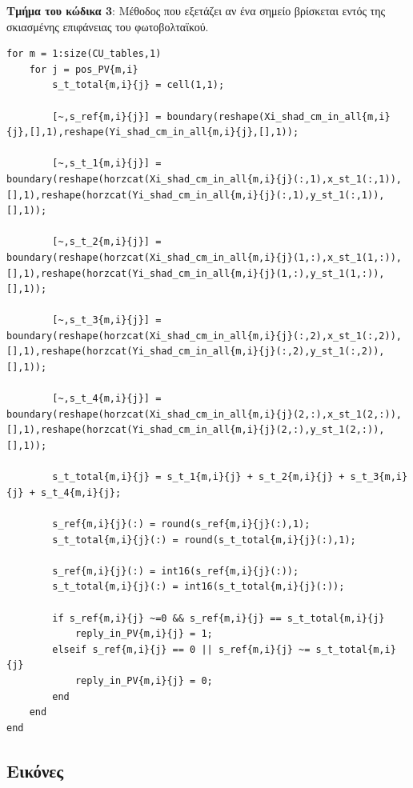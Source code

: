 \documentclass[12pt, a4paper]{report} %
\renewcommand{\thesubsection}{\arabic{section}.\arabic{subsection}.} %
\begin{document}
\noindent \textbf{Τμήμα του κώδικα 3}: Μέθοδος που εξετάζει αν ένα σημείο βρίσκεται εντός της σκιασμένης επιφάνειας του φωτοβολταϊκού.
\begin{lstlisting}
for m = 1:size(CU_tables,1)
    for j = pos_PV{m,i}
        s_t_total{m,i}{j} = cell(1,1);
        
        [~,s_ref{m,i}{j}] = boundary(reshape(Xi_shad_cm_in_all{m,i}{j},[],1),reshape(Yi_shad_cm_in_all{m,i}{j},[],1));

        [~,s_t_1{m,i}{j}] = boundary(reshape(horzcat(Xi_shad_cm_in_all{m,i}{j}(:,1),x_st_1(:,1)),[],1),reshape(horzcat(Yi_shad_cm_in_all{m,i}{j}(:,1),y_st_1(:,1)),[],1));
        
        [~,s_t_2{m,i}{j}] = boundary(reshape(horzcat(Xi_shad_cm_in_all{m,i}{j}(1,:),x_st_1(1,:)),[],1),reshape(horzcat(Yi_shad_cm_in_all{m,i}{j}(1,:),y_st_1(1,:)),[],1));

        [~,s_t_3{m,i}{j}] = boundary(reshape(horzcat(Xi_shad_cm_in_all{m,i}{j}(:,2),x_st_1(:,2)),[],1),reshape(horzcat(Yi_shad_cm_in_all{m,i}{j}(:,2),y_st_1(:,2)),[],1));

        [~,s_t_4{m,i}{j}] = boundary(reshape(horzcat(Xi_shad_cm_in_all{m,i}{j}(2,:),x_st_1(2,:)),[],1),reshape(horzcat(Yi_shad_cm_in_all{m,i}{j}(2,:),y_st_1(2,:)),[],1));

        s_t_total{m,i}{j} = s_t_1{m,i}{j} + s_t_2{m,i}{j} + s_t_3{m,i}{j} + s_t_4{m,i}{j};
        
        s_ref{m,i}{j}(:) = round(s_ref{m,i}{j}(:),1);
        s_t_total{m,i}{j}(:) = round(s_t_total{m,i}{j}(:),1);

        s_ref{m,i}{j}(:) = int16(s_ref{m,i}{j}(:));
        s_t_total{m,i}{j}(:) = int16(s_t_total{m,i}{j}(:));

        if s_ref{m,i}{j} ~=0 && s_ref{m,i}{j} == s_t_total{m,i}{j}
            reply_in_PV{m,i}{j} = 1;
        elseif s_ref{m,i}{j} == 0 || s_ref{m,i}{j} ~= s_t_total{m,i}{j}
            reply_in_PV{m,i}{j} = 0;
        end
    end
end 
\end{lstlisting}

\subsection{Εικόνες}\label{appx_B}
\renewcommand\thefigure{\thesubsection\arabic{figure}}

\vspace{0.001cm}
\end{document}

